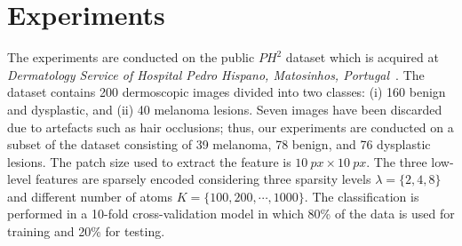 \section{Experiments}
\label{sec:exp}
The experiments are conducted on the public $PH^2$ dataset which is acquired at \textit{Dermatology Service of Hospital Pedro Hispano, Matosinhos, Portugal}~\cite{barata2013two}. 
The dataset contains 200 dermoscopic images divided into two classes: (i) 160 benign and dysplastic, and (ii) 40 melanoma lesions. 
Seven images have been discarded due to artefacts such as hair occlusions; thus, our experiments are conducted on a subset of the dataset consisting of 39 melanoma, 78 benign, and 76 dysplastic lesions.
The patch size used to extract the feature is $\SI{10}{px} \times \SI{10}{px}$.
The three low-level features are sparsely encoded considering three sparsity levels $\lambda=\{2,4,8\}$ and different number of atoms $K = \{100, 200, \cdots, 1000\}$.
The classification is performed in a 10-fold cross-validation model in which 80\% of the data is used for training and 20\% for testing. 
 